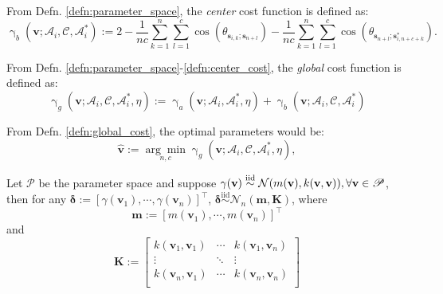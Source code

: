 \begin{defn}\label{defn:center_cost}
    From Defn. \ref{defn:parameter_space}, the \textit{center} cost function is defined as:
    \begin{equation}
        \operatorname{\gamma}_{b}(\mathbf{v};\mathscr{A}_i,\mathscr{C},\mathscr{A}_i^{*}):=2-\frac{1}{nc}\sum_{k=1}^{n}\sum_{l=1}^{c}\cos\left(\theta_{\mathbf{s}_{i,k};\mathbf{s}_{n+l}}\right)-\frac{1}{nc}\sum_{k=1}^{n}\sum_{l=1}^{c}\cos\left(\theta_{\mathbf{s}_{n+l};\mathbf{s}_{i,n+c+k}^{*}}\right).
    \end{equation}
\end{defn}
\begin{defn}\label{defn:global_cost}
    From Defn. \ref{defn:parameter_space}-\ref{defn:center_cost}, the \textit{global} cost function is defined as:
    \begin{equation}
        \operatorname{\gamma}_{g}(\mathbf{v};\mathscr{A}_i,\mathscr{C},\mathscr{A}_i^{*},\eta):=\operatorname{\gamma}_{a}(\mathbf{v};\mathscr{A}_i,\mathscr{A}_i^{*},\eta)+\operatorname{\gamma}_{b}(\mathbf{v};\mathscr{A}_i,\mathscr{C},\mathscr{A}_i^{*})
    \end{equation}
\end{defn}
\begin{defn} From Defn. \ref{defn:global_cost}, the optimal parameters would be:
\begin{equation}
    \hat{\mathbf{v}}:=\underset{n,c}{\arg\min}\operatorname{\gamma}_{g}(\mathbf{v};\mathscr{A}_i,\mathscr{C},\mathscr{A}_i^{*},\eta),
\end{equation}    
\end{defn}
\begin{prop}\label{prop:hypedist}
    Let $\mathscr{P}$ be the parameter space and suppose $\gamma(\mathbf{v})\overset{\mathrm{iid}}{\sim}\mathcal{N}(m(\mathbf{v}),k(\mathbf{v},\mathbf{v})), \linebreak\forall \mathbf{v}\in\mathscr{P}$, then for any $\boldsymbol{\delta}:=[\gamma(\mathbf{v}_1),\cdots,\gamma(\mathbf{v}_n)]^{\top}$, $\boldsymbol{\delta}\overset{\mathrm{iid}}{\sim}\mathcal{N}_n(\mathbf{m},\mathbf{K})$, where 
    \begin{equation}
        \mathbf{m}:=[m(\mathbf{v}_1),\cdots,m(\mathbf{v}_n)]^{\top}
    \end{equation}
    and
    \begin{equation}
        \mathbf{K}:=\left[\begin{matrix}
        k(\mathbf{v}_1,\mathbf{v}_1)&\cdots&k(\mathbf{v}_1,\mathbf{v}_n)\\
        \vdots&\ddots&\vdots\\
        k(\mathbf{v}_n,\mathbf{v}_1)&\cdots&k(\mathbf{v}_n,\mathbf{v}_n)\\
        \end{matrix}\right]
    \end{equation}
\end{prop}
